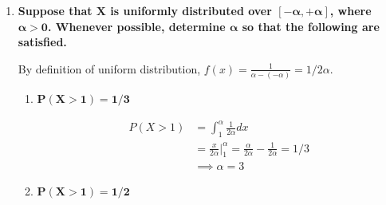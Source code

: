 \documentclass[10pt, oneside]{article}
\begin{document}
\begin{enumerate}[label=4.\arabic*]
\begin{enumerate}
	Since $X$ may be 1 or 2 or $\cdots$ or 8, we calculate $P( X \leq 8) = \sum^8_{k = 1} \binom{10}{k} 0.3^k 0.7^{10-k} = \boxed{0.972}$.
	
	\item  \begin{tcolorbox}[
	  colback=Cerulean!5!white,
	  colframe=Cerulean!75!black]
	\textbf{$\bm{P(X = 7)}$}
	\end{tcolorbox}
	
	$P(X = 7) = \binom{10}{7} 0.3^7 0.7^3 = \boxed{0.009}$
	
	\item  \begin{tcolorbox}[
	  colback=Cerulean!5!white,
	  colframe=Cerulean!75!black]
	\textbf{$\bm{P(X > 6)}$}
	\end{tcolorbox}
	
	$P(X > 6) = \sum^10_{k = 7} \binom{10}{k} 0.3^k 0.7^{10-k} = \boxed{0.011}$
	\end{enumerate}
	
\item  \begin{tcolorbox}[
  colback=Cerulean!5!white,
  colframe=Cerulean!75!black]
\textbf{Suppose that $\bm{X}$ is uniformly distributed over $\bm{[-\alpha, +\alpha]}$, where $\bm{\alpha > 0}$. Whenever possible, determine $\bm{\alpha}$ so that the following are satisfied.}
\end{tcolorbox}

	By definition of uniform distribution, $f(x) = \frac{1}{\alpha - (-\alpha)} = 1/2\alpha$.

	\begin{enumerate}
	\item  \begin{tcolorbox}[
	  colback=Cerulean!5!white,
	  colframe=Cerulean!75!black]
	\textbf{$\bm{P(X > 1) = 1/3}$}
	\end{tcolorbox}
	
	\begin{align*}
	P(X > 1) &= \int^\alpha_1 \frac{1}{2\alpha} dx \\
	&= \frac{x}{2 \alpha} \Big|^\alpha_1 = \frac{\alpha}{2\alpha} - \frac{1}{2\alpha} = 1/3\\
	&\implies \boxed{\alpha = 3}
	\end{align*}
		
	\item  \begin{tcolorbox}[
	  colback=Cerulean!5!white,
	  colframe=Cerulean!75!black]
	\textbf{$\bm{P(X > 1) = 1/2}$}
	\end{tcolorbox}
	

\end{enumerate}
\end{enumerate}
\end{document}
